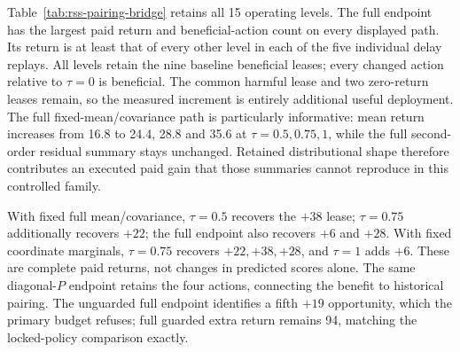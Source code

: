 \documentclass[10pt]{article}
\begin{document}
Table~\ref{tab:rss-pairing-bridge} retains all 15 operating levels.
The full endpoint has the largest paid return and beneficial-action count
on every displayed path. Its return is at least that of every other level
in each of the five individual delay replays. All levels retain the nine
baseline beneficial leases; every changed action relative to $\tau=0$
is beneficial. The common harmful lease and two zero-return leases remain,
so the measured increment is entirely additional useful deployment.
The full fixed-mean/covariance path is particularly informative: mean
return increases from 16.8 to 24.4, 28.8 and 35.6 at
$\tau=0.5,0.75,1$, while the full second-order residual summary stays
unchanged. Retained distributional shape therefore contributes an executed
paid gain that those summaries cannot reproduce in this controlled family.

\begin{table}[t]
\centering\small
\caption{All frozen-state RSS information interventions under the same
Fixed130/$B=130$ execution rule. Each entry is mean net increment /
pooled beneficial admissions. Columns vary retained pairing only.
Every level retains one harmful admission and two zero-return admissions.}
\label{tab:rss-pairing-bridge}
\end{table}

With fixed full mean/covariance, $\tau=0.5$ recovers the $+38$ lease;
$\tau=0.75$ additionally recovers $+22$; the full endpoint also recovers
$+6$ and $+28$. With fixed coordinate marginals, $\tau=0.75$ recovers
$+22,+38,+28$, and $\tau=1$ adds $+6$. These are complete paid returns,
not changes in predicted scores alone. The same diagonal-$P$ endpoint
retains the four actions, connecting the benefit to historical pairing.
The unguarded full endpoint identifies a fifth $+19$ opportunity, which the
primary budget refuses; full guarded extra return remains 94, matching the
locked-policy comparison exactly.
\end{document}
